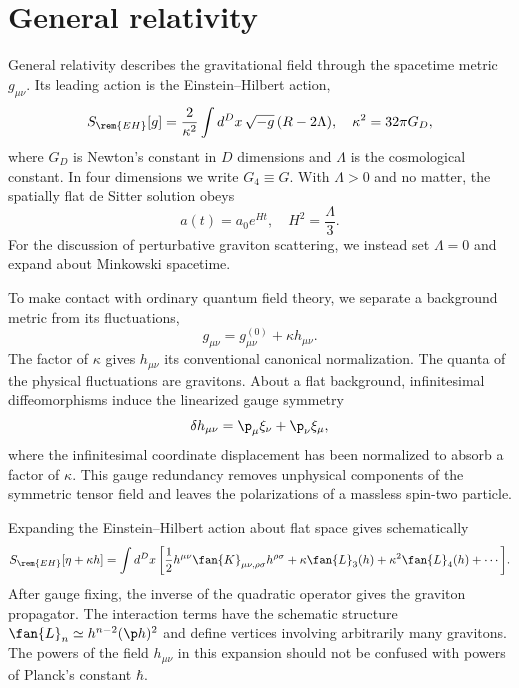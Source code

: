 \section{General relativity}
General relativity describes the gravitational field through the spacetime metric $g_{\mu\nu}$. Its leading action is the Einstein--Hilbert action,
\begin{equation}
    S_{\rem{EH}}[g] = \frac{2}{\kappa^2}\int d^D x\,\sqrt{-g}\,(R-2\Lambda),\quad \kappa^2 = 32\pi G_D,
\end{equation}
where $G_D$ is Newton's constant in $D$ dimensions and $\Lambda$ is the cosmological constant. In four dimensions we write $G_4 \equiv G$. With $\Lambda > 0$ and no matter, the spatially flat de Sitter solution obeys
\begin{equation}
    a(t) = a_0e^{Ht},\quad H^2 = \frac{\Lambda}{3}.
\end{equation}
For the discussion of perturbative graviton scattering, we instead set $\Lambda = 0$ and expand about Minkowski spacetime.

To make contact with ordinary quantum field theory, we separate a background metric from its fluctuations,
\begin{equation}
    g_{\mu\nu} = g^{(0)}_{\mu\nu} + \kappa h_{\mu\nu}.
\end{equation}
The factor of $\kappa$ gives $h_{\mu\nu}$ its conventional canonical normalization. The quanta of the physical fluctuations are gravitons. About a flat background, infinitesimal diffeomorphisms induce the linearized gauge symmetry
\begin{equation}
    \delta h_{\mu\nu} = \p_\mu\xi_\nu + \p_\nu\xi_\mu,
\end{equation}
where the infinitesimal coordinate displacement has been normalized to absorb a factor of $\kappa$. This gauge redundancy removes unphysical components of the symmetric tensor field and leaves the polarizations of a massless spin-two particle.

Expanding the Einstein--Hilbert action about flat space gives schematically
\begin{equation}
    S_{\rem{EH}}[\eta+\kappa h] = \int d^D x\, \bigg[\frac{1}{2}h^{\mu\nu}\fan{K}_{\mu\nu,\rho\sigma}h^{\rho\sigma} + \kappa\fan{L}_3(h)+\kappa^2\fan{L}_4(h)+\cdots\bigg].
\end{equation}
After gauge fixing, the inverse of the quadratic operator gives the graviton propagator. The interaction terms have the schematic structure $\fan{L}_n\simeq h^{n-2}(\p h)^2$ and define vertices involving arbitrarily many gravitons. The powers of the field $h_{\mu\nu}$ in this expansion should not be confused with powers of Planck's constant $\hbar$.

